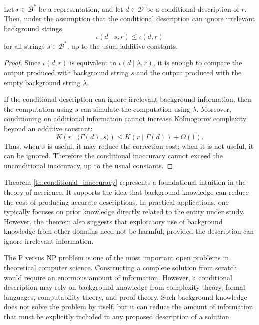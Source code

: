 \begin{theorem}
\label{th:conditional_inaccuracy}
Let \(r \in \mathcal{B}^\ast\) be a representation, and let \(d \in \mathcal{D}\) be a conditional description of \(r\). Then, under the assumption that the conditional description can ignore irrelevant background strings,
\[
\iota(d \mid s, r) \leq \iota(d , r)
\]
for all strings \(s \in \mathcal{B}^\ast\), up to the usual additive constants.
\end{theorem}

\begin{proof}
Since \(\iota(d,r)\) is equivalent to \(\iota(d\mid \lambda,r)\), it is enough to compare the output produced with background string \(s\) and the output produced with the empty background string \(\lambda\).

If the conditional description can ignore irrelevant background information, then the computation using \(s\) can simulate the computation using \(\lambda\). Moreover, conditioning on additional information cannot increase Kolmogorov complexity beyond an additive constant:
\[
K(r\mid \langle \Gamma(d),s\rangle)
\leq
K(r\mid \Gamma(d))+O(1).
\]
Thus, when \(s\) is useful, it may reduce the correction cost; when it is not useful, it can be ignored. Therefore the conditional inaccuracy cannot exceed the unconditional inaccuracy, up to the usual constants.
\end{proof}

Theorem \ref{th:conditional_inaccuracy} represents a foundational intuition in the theory of nescience. It supports the idea that background knowledge can reduce the cost of producing accurate descriptions. In practical applications, one typically focuses on prior knowledge directly related to the entity under study. However, the theorem also suggests that exploratory use of background knowledge from other domains need not be harmful, provided the description can ignore irrelevant information.

\begin{example}
The P versus NP problem is one of the most important open problems in theoretical computer science. Constructing a complete solution from scratch would require an enormous amount of information. However, a conditional description may rely on background knowledge from complexity theory, formal languages, computability theory, and proof theory. Such background knowledge does not solve the problem by itself, but it can reduce the amount of information that must be explicitly included in any proposed description of a solution.
\end{example}

